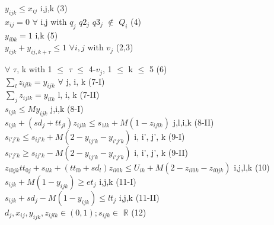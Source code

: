 \documentclass[12pt, letterpaper]{article}
\begin{document}
\(y_{ijk} \leq x_{ij} \) \hspace{1cm} \forall i,j,k \hfill (3)\\
\(x_{ij} = 0\) \hspace{1cm} $\forall$ i,j with $q_j$ $q2_j$ $q3_j$ $\notin$ $Q_i$ \hfill (4)\\
\(y_{i0k} = 1\) \hspace{1cm} \forall i,k \hfill (5)\\
\(y_{ijk} + y_{ij,k+\tau} \leq 1\) \hspace{1cm} $\forall{i,j}$ with $v_j$ \in (2,3) \par
\hspace{3.5cm} $\forall$ $\tau$, k with 1 $\leq$ $\tau$ $\leq$ 4-$v_j$, 1 $\leq$ k $\leq$ 5 \hfill (6) \\
\(\sum_{l} z_{ijlk} = y_{ijk}\) \hspace{1cm} $\forall$ j, i, k \hfill (7-I)\\
\(\sum_{j} z_{ijlk} = y_{ilk}\) \hspace{1cm} \forall l, i, k \hfill (7-II) \\
\(s_{ijk} \leq M y_{ijk}\) \hspace{1cm} \forall j,i,k \hfill (8-I) \\
\(s_{ijk} + (sd_j + tt_{jl}) z_{ijlk} \leq s_{1lk} + M (1-z_{ijlk})\) \hspace{1cm} \forall j,l,i,k \hfill (8-II)\\
\(s_{i'j'k} \leq s_{ij'k} + M(2-y_{ij'k} - y_{i'j'k})\) \hspace{1cm} \forall i, i', j', k \hfill (9-I) \\
\(s_{i'j'k} \geq s_{ij'k} - M(2-y_{ij'k} - y_{i'j'k})\) \hspace{1cm} \forall i, i', j', k \hfill (9-II) \\
\(z_{i0jk} tt_{0j} + s_{ilk} + (tt_{l0} + sd_{l})z_{il0k} \leq U_{ik} + M(2-z_{il0k}-z_{i0jk})\) \hspace{1cm} \forall i,j,l,k \hfill (10)\\
\(s_{ijk} + M(1-y_{ijk}) \geq et_{j} \) \hspace{1cm} \forall i,j,k \hfill (11-I)\\
\(s_{ijk} + sd_{j} - M(1-y_{ijk}) \leq lt_{j}\) \hspace{1cm} \forall i,j,k \hfill (11-II)\\
\(d_j, x_{ij}, y_{ijk}, z_{ijlk} \in (0,1); s_{ijk} \in\) $\mathbb{R}$ \hfill (12)\\
\par
\end{document}
